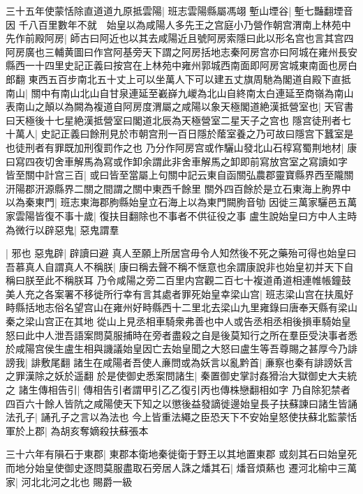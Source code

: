 三十五年使蒙恬除直道道九原抵雲陽|{
	班志雲陽縣屬馮翊}
塹山堙谷|{
	塹七豔翻堙音因}
千八百里數年不就　始皇以為咸陽人多先王之宫庭小乃營作朝宫渭南上林苑中先作前殿阿房|{
	師古曰阿近也以其去咸陽近且號阿房索隱曰此以形名宫也言其宫四阿房廣也三輔黄圖曰作宫阿基旁天下謂之阿房括地志秦阿房宫亦曰阿城在雍州長安縣西一十四里史記正義曰按宫在上林苑中雍州郭城西南面即阿房宮城東南面也房白郎翻}
東西五百步南北五十丈上可以坐萬人下可以建五丈旗周馳為閣道自殿下直抵南山|{
	關中有南山北山自甘泉連延至嶻嶭九嵕為北山自終南太白連延至商嶺為南山}
表南山之顛以為闕為複道自阿房度渭屬之咸陽以象天極閣道絶漢抵營室也|{
	天官書曰天極後十七星絶漢抵營室曰閣道北辰為天極營室二星天子之宫也}
隱宫徒刑者七十萬人|{
	史記正義曰餘刑見於市朝宫刑一百日隱於䕃室養之乃可故曰隱宫下蠶室是也徒刑者有罪既加刑復罰作之也}
乃分作阿房宫或作驪山發北山石椁寫蜀荆地材|{
	康曰寫四夜切舍車解馬為寫或作卸余謂此非舍車解馬之卸即前寫放宫室之寫讀如字}
皆至關中計宫三百|{
	或曰皆至當屬上句關中記云東自函關弘農郡靈寶縣界西至隴關汧陽郡汧源縣界二關之間謂之關中東西千餘里}
關外四百餘於是立石東海上朐界中以為秦東門|{
	班志東海郡朐縣始皇立石海上以為東門闕朐音劬}
因徙三萬家驪邑五萬家雲陽皆復不事十歲|{
	復扶目翻除也不事者不供征役之事}
盧生說始皇曰方中人主時為微行以辟惡鬼|{
	惡鬼謂羣}


|{
	邪也}
惡鬼辟|{
	辟讀曰避}
真人至願上所居宫毋令人知然後不死之藥殆可得也始皇曰吾慕真人自謂真人不稱朕|{
	康曰稱去聲不稱不惬意也余謂康說非也始皇初并天下自稱曰朕至此不稱朕耳}
乃令咸陽之旁二百里内宫觀二百七十複道甬道相連帷帳鐘鼓美人充之各案署不移徙所行幸有言其處者罪死始皇幸梁山宫|{
	班志梁山宫在扶風好畤縣括地志俗名望宫山在雍州好畤縣西十二里北去梁山九里雍錄曰唐奉天縣有梁山秦之梁山宫正在其地}
從山上見丞相車騎衆弗善也中人或告丞相丞相後損車騎始皇怒曰此中人泄吾語案問莫服捕時在旁者盡殺之自是後莫知行之所在羣臣受決事者悉於咸陽宫侯生盧生相與譏議始皇因亡去始皇聞之大怒曰盧生等吾尊賜之甚厚今乃誹謗我|{
	誹敷尾翻}
諸生在咸陽者吾使人亷問或為妖言以亂黔首|{
	亷察也秦有誹謗妖言之罪漢除之妖於遥翻}
於是使御史悉案問諸生|{
	秦置御史掌討姦猾治大獄御史大夫統之}
諸生傳相告引|{
	傳相告引者謂甲引乙乙復引丙也傳株戀翻相如字}
乃自除犯禁者四百六十餘人皆阬之咸陽使天下知之以懲後益發謫徙邊始皇長子扶蘇諫曰諸生皆誦法孔子|{
	誦孔子之言以為法也}
今上皆重法繩之臣恐天下不安始皇怒使扶蘇北監蒙恬軍於上郡|{
	為胡亥奪嫡殺扶蘇張本}


三十六年有隕石于東郡|{
	東郡本衛地秦徙衛于野王以其地置東郡}
或刻其石曰始皇死而地分始皇使御史逐問莫服盡取石旁居人誅之燔其石|{
	燔音煩爇也}
遷河北榆中三萬家|{
	河北北河之北也}
賜爵一級


